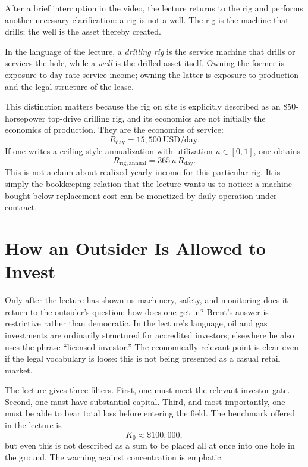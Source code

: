 After a brief interruption in the video, the lecture returns to the rig and performs another necessary clarification: a rig is not a well. The rig is the machine that drills; the well is the asset thereby created.

\begin{definition}
In the language of the lecture, a \emph{drilling rig} is the service machine that drills or services the hole, while a \emph{well} is the drilled asset itself. Owning the former is exposure to day-rate service income; owning the latter is exposure to production and the legal structure of the lease.
\end{definition}

This distinction matters because the rig on site is explicitly described as an \(850\)-horsepower top-drive drilling rig, and its economics are not initially the economics of production. They are the economics of service:
\begin{equation}
R_{\mathrm{day}} = 15{,}500\ \mathrm{USD/day}.
\end{equation}
If one writes a ceiling-style annualization with utilization \(u \in [0,1]\), one obtains
\begin{equation}
R_{\mathrm{rig,annual}} = 365\,u\,R_{\mathrm{day}}.
\end{equation}
This is not a claim about realized yearly income for this particular rig. It is simply the bookkeeping relation that the lecture wants us to notice: a machine bought below replacement cost can be monetized by daily operation under contract.

\section{How an Outsider Is Allowed to Invest}

Only after the lecture has shown us machinery, safety, and monitoring does it return to the outsider's question: how does one get in? Brent's answer is restrictive rather than democratic. In the lecture's language, oil and gas investments are ordinarily structured for accredited investors; elsewhere he also uses the phrase ``licensed investor.'' The economically relevant point is clear even if the legal vocabulary is loose: this is not being presented as a casual retail market.

The lecture gives three filters. First, one must meet the relevant investor gate. Second, one must have substantial capital. Third, and most importantly, one must be able to bear total loss before entering the field. The benchmark offered in the lecture is
\begin{equation}
K_0 \approx \$100{,}000,
\end{equation}
but even this is not described as a sum to be placed all at once into one hole in the ground. The warning against concentration is emphatic.

